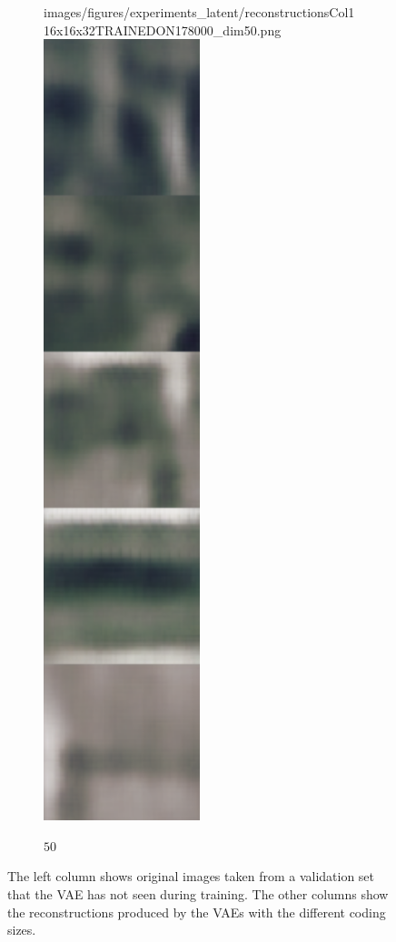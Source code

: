 \begin{figure}[H]
\begin{subfigure}[t]{.19\textwidth}
        {images/figures/experiments_latent/reconstructionsCol116x16x32TRAINEDON178000_dim50.png}\hfill
        \includegraphics[width=0.5\textwidth]
        {images/figures/experiments_latent/reconstructionsCol216x16x32TRAINEDON178000_dim50.png}
        \caption{$50$}
    \end{subfigure}
    \caption{The left column shows original images taken from a validation set that the VAE has not seen during
    training. The other columns show the reconstructions produced by the VAEs with the different coding sizes.}
    \label{figure_reconstructions_convolutional}
\end{figure} 


